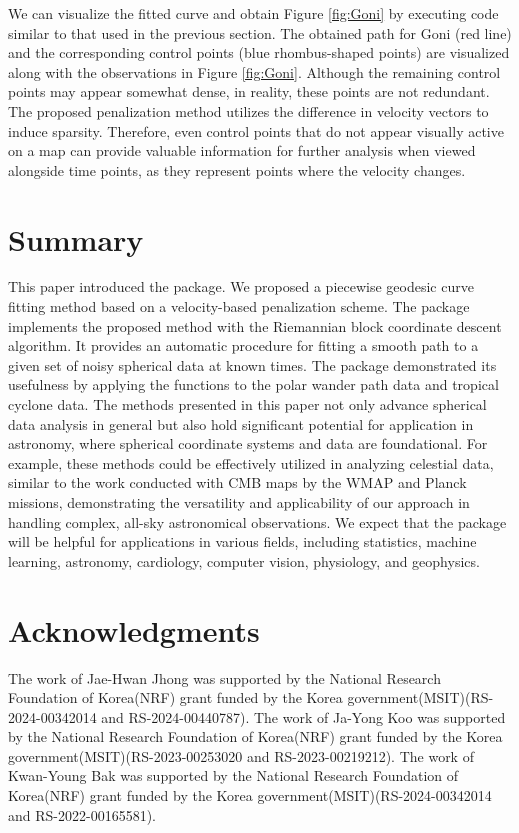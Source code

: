 We can visualize the fitted curve and obtain Figure \ref{fig:Goni} by executing code similar to that used in the previous section. The obtained path for Goni (red line) and the corresponding control points (blue rhombus-shaped points) are visualized along with the observations in Figure \ref{fig:Goni}. Although the remaining control points may appear somewhat dense, in reality, these points are not redundant. The proposed penalization method utilizes the difference in velocity vectors to induce sparsity. Therefore, even control points that do not appear visually active on a map can provide valuable information for further analysis when viewed alongside time points, as they represent points where the velocity changes.

\section{Summary}\label{conclusion}

This paper introduced the  package. We proposed a piecewise geodesic curve fitting method based on a velocity-based penalization scheme. The  package implements the proposed method with the Riemannian block coordinate descent algorithm. It provides an automatic procedure for fitting a smooth path to a given set of noisy spherical data at known times. The  package demonstrated its usefulness by applying the functions to the polar wander path data and tropical cyclone data.
The methods presented in this paper not only advance spherical data analysis in general but also hold significant potential for application in astronomy, where spherical coordinate systems and data are foundational. For example, these methods could be effectively utilized in analyzing celestial data, similar to the work conducted with CMB maps by the WMAP and Planck missions, demonstrating the versatility and applicability of our approach in handling complex, all-sky astronomical observations.
We expect that the  package will be helpful for applications in various fields, including statistics, machine learning, astronomy, cardiology, computer vision, physiology, and geophysics.

\section{Acknowledgments}\label{acknowledgments}

The work of Jae-Hwan Jhong was supported by the National Research Foundation of Korea(NRF) grant funded by the Korea government(MSIT)(RS-2024-00342014 and RS-2024-00440787).
The work of Ja-Yong Koo was supported by the National Research Foundation of Korea(NRF) grant funded by the Korea government(MSIT)(RS-2023-00253020 and RS-2023-00219212).
The work of Kwan-Young Bak was supported by the National Research Foundation of Korea(NRF) grant funded by the Korea government(MSIT)(RS-2024-00342014 and RS-2022-00165581).

